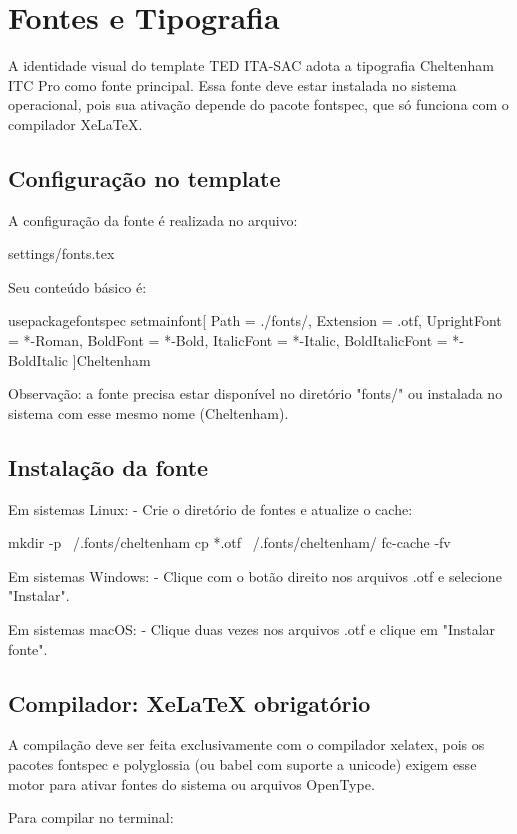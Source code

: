 \chapter{Fontes e Tipografia}

A identidade visual do template TED ITA-SAC adota a tipografia Cheltenham ITC Pro como fonte principal. Essa fonte deve estar instalada no sistema operacional, pois sua ativação depende do pacote fontspec, que só funciona com o compilador XeLaTeX.

\section{Configuração no template}

A configuração da fonte é realizada no arquivo:

settings/fonts.tex

Seu conteúdo básico é:

usepackage{fontspec}
setmainfont[
Path = ./fonts/,
Extension = .otf,
UprightFont = *-Roman,
BoldFont = *-Bold,
ItalicFont = *-Italic,
BoldItalicFont = *-BoldItalic
]{Cheltenham}

Observação: a fonte precisa estar disponível no diretório "fonts/" ou instalada no sistema com esse mesmo nome (Cheltenham).

\section{Instalação da fonte}

Em sistemas Linux:
- Crie o diretório de fontes e atualize o cache:

mkdir -p ~/.fonts/cheltenham  
cp *.otf ~/.fonts/cheltenham/  
fc-cache -fv

Em sistemas Windows:
- Clique com o botão direito nos arquivos .otf e selecione "Instalar".

Em sistemas macOS:
- Clique duas vezes nos arquivos .otf e clique em "Instalar fonte".

\section{Compilador: XeLaTeX obrigatório}

A compilação deve ser feita exclusivamente com o compilador xelatex, pois os pacotes fontspec e polyglossia (ou babel com suporte a unicode) exigem esse motor para ativar fontes do sistema ou arquivos OpenType.

Para compilar no terminal:

